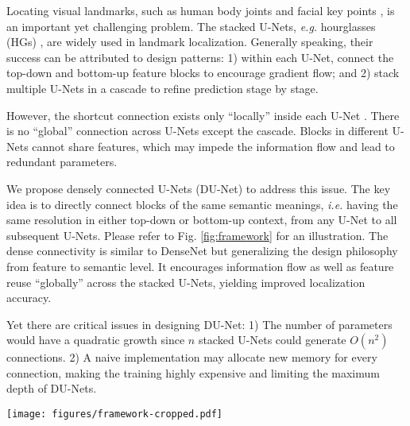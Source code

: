 \documentclass[runningheads]{llncs}
\begin{document}
Locating visual landmarks, such as human body joints \cite{toshev2014deeppose} and facial key points \cite{xiong2013supervised}, is an important yet challenging problem. The stacked U-Nets, {\it e.g.} hourglasses (HGs) \cite{newell2016stacked}, are widely used in landmark localization. Generally speaking, their success can be attributed to design patterns: 1) within each U-Net, connect the top-down and bottom-up feature blocks to encourage gradient flow; and 2) stack multiple U-Nets in a cascade to refine prediction stage by stage.

However, the shortcut connection exists only ``locally'' inside each U-Net \cite{ronneberger2015u}. There is no ``global'' connection across U-Nets except the cascade. Blocks in different U-Nets cannot share features, which may impede the information flow and lead to redundant parameters.

We propose densely connected U-Nets (DU-Net) to address this issue. The key idea is to directly connect blocks of the same semantic meanings, {\it i.e.} having the same resolution in either top-down or bottom-up context, from any U-Net to all subsequent U-Nets. Please refer to Fig. \ref{fig:framework} for an illustration. The dense connectivity is similar to DenseNet \cite{huang2016densely} but generalizing the design philosophy from feature to semantic level. It encourages information flow as well as feature reuse ``globally'' across the stacked U-Nets, yielding improved localization accuracy. 

Yet there are critical issues in designing DU-Net: 1) The number of parameters would have a quadratic growth since $n$ stacked U-Nets could generate $O(n^2)$ connections. 2) A naive implementation may allocate new memory for every connection, making the training highly expensive and limiting the maximum depth of DU-Nets. 





\begin{figure*}[t!]
\centering
  \texttt{[image: figures/framework-cropped.pdf]}
\caption{Illustration of stacked U-Nets and DU-Net. Stacked U-Nets has skip connections only within each U-Net. In contrast, DU-Net also connects blocks with the same semantic meanings across different U-Nets. The feature reuse could significantly reduce the size of bottleneck in each block, as shown in the right figure. Consequently, with the same number of U-Nets, DU-Net has only 30\% parameters of stacked U-Nets.}
\label{fig:framework}
\end{figure*}
\end{document}
